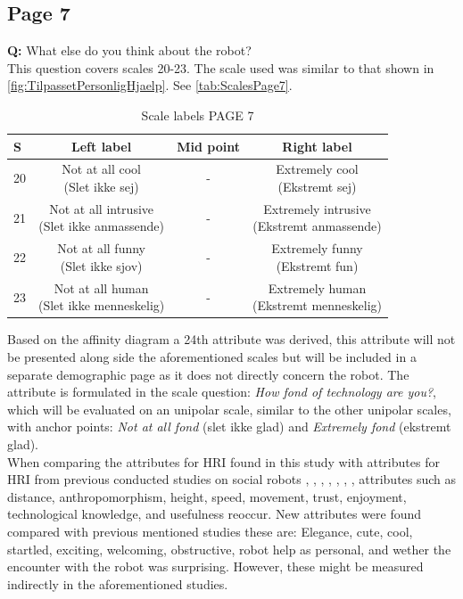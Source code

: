 \subsection{Page 7}
\noindent
\textbf{Q:} What else do you think about the robot?\\%
This question covers scales 20-23. The scale used was similar to that shown in \autoref{fig:TilpassetPersonligHjaelp}. See \autoref{tab:ScalesPage7}.
%
\begin{table}[H]
	\centering
\caption{Scale labels PAGE 7}
	\label{tab:ScalesPage7} 
	\begin{tabular}{l|c|c|c}
		S    & Left label & Mid point & Right label \\\hline
		20   & \makecell{Not at all cool\\(Slet ikke sej)}  & - & \makecell{Extremely cool \\(Ekstremt sej)}        \\\hline
		21   & \makecell{Not at all intrusive \\(Slet ikke anmassende)} & - & \makecell{Extremely intrusive \\(Ekstremt anmassende)}         \\\hline
		22   & \makecell{Not at all funny\\(Slet ikke sjov)} & - & \makecell{Extremely funny \\(Ekstremt fun)}         \\\hline
	 	23   & \makecell{Not at all human \\(Slet ikke menneskelig)} & - & \makecell{Extremely human \\(Ekstremt menneskelig)}               
	\end{tabular}        
\end{table}
\noindent
%
Based on the affinity diagram a 24th attribute was derived, this attribute will not be presented along side the aforementioned scales but will be included in a separate demographic page as it does not directly concern the robot. The attribute is formulated in the scale question: \textit{How fond of technology are you?}, which will be evaluated on an unipolar scale, similar to the other unipolar scales, with anchor points: \textit{Not at all fond} (slet ikke glad) and \textit{Extremely fond} (ekstremt glad).\\  

\noindent
When comparing the attributes for HRI found in this study with attributes for HRI from previous conducted studies on social robots \cite{PDF:ExploringInfluencingVariable}, \cite{PDF:SharingALifeHarvey}, \cite{PDF:InTheCompanyofRobots}, \cite{PDF:CloseButNotStuck}, \cite{PDF:TheImpactOfTraveler}, \cite{PDF:HumanRobotEmodiedInteraction}, \cite{PDF:RecommendationEffects}, attributes such as distance, anthropomorphism, height, speed, movement, trust, enjoyment, technological knowledge, and usefulness reoccur. New attributes were found compared with previous mentioned studies these are: Elegance, cute, cool, startled, exciting, welcoming, obstructive, robot help as personal, and wether the encounter with the robot was surprising. However, these might be measured indirectly in the aforementioned studies.


